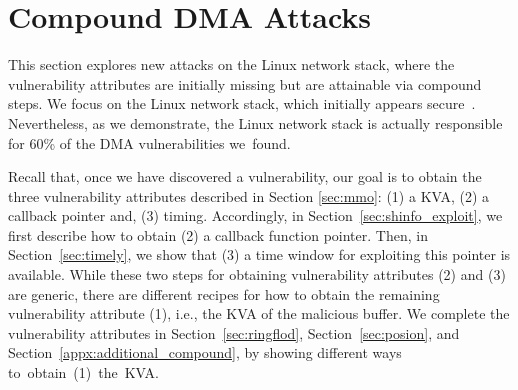 \section{Compound DMA Attacks}\label{sec:linux_net}



This section explores new attacks on the Linux network stack, where the vulnerability attributes are initially missing but are attainable via compound steps.
We focus on the Linux network stack, which initially appears  secure~\cite{thunder}.
Nevertheless, as we demonstrate, the Linux network stack is actually responsible for 60\% of the DMA vulnerabilities \mbox{we found.}

Recall that, once we have discovered a \subpage{} vulnerability, our goal is to obtain the three vulnerability attributes described in Section \ref{sec:mmo}: (1) a KVA, (2) a callback pointer and, (3) timing. 
Accordingly, in Section~\ref{sec:shinfo_exploit}, we first describe how to obtain (2) a callback function pointer. Then, in Section~\ref{sec:timely}, we show that (3) a time window for exploiting this pointer is available. 
While these two steps for obtaining vulnerability attributes (2) and (3) are generic, there are different recipes for how to obtain the remaining vulnerability attribute (1), i.e., the KVA of the malicious buffer.
We complete the vulnerability attributes in Section~\ref{sec:ringflod}, Section~\ref{sec:posion}, and Section~\ref{appx:additional_compound}, by showing different ways \mbox{to obtain (1) the KVA.}



